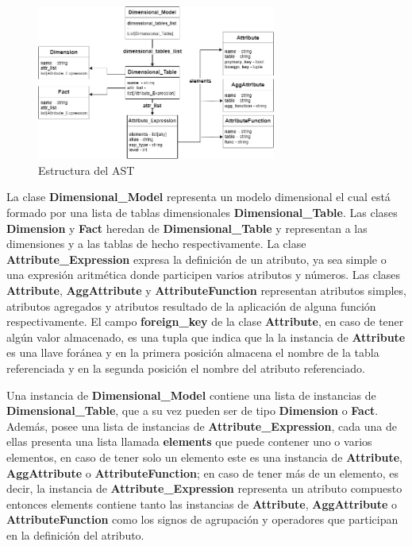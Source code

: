 \begin{figure}[htb]
    \centering
    \includegraphics[width=0.7\textwidth]{Graphics/ast.png}
    \caption{Estructura del AST}
    \label{fig:ast}
\end{figure}

La clase \textbf{Dimensional\_Model} representa un modelo dimensional el cual est\'a formado por una lista de tablas 
dimensionales \textbf{Dimensional\_Table}. Las clases \textbf{Dimension} y \textbf{Fact} heredan de \textbf{Dimensional\_Table} 
y representan a las dimensiones y a las tablas de hecho respectivamente. La clase \textbf{Attribute\_Expression} expresa 
la definición de un atributo, ya sea simple o una expresión aritmética donde participen varios atributos y n\'umeros. 
Las clases \textbf{Attribute}, \textbf{AggAttribute} y \textbf{AttributeFunction} representan atributos simples, atributos 
agregados y atributos resultado de la aplicación de alguna función respectivamente. El campo \textbf{foreign\_key} de 
la clase \textbf{Attribute}, en caso de tener alg\'un valor almacenado, es una tupla que indica que la la instancia 
de \textbf{Attribute} es una llave for\'anea y en la primera posición almacena el nombre de la tabla referenciada y 
en la segunda posición el nombre del atributo referenciado.

Una instancia de \textbf{Dimensional\_Model} contiene una lista de instancias de \textbf{Dimensional\_Table}, que a su vez pueden ser de tipo 
\textbf{Dimension} o \textbf{Fact}. Además, posee una lista de instancias de \textbf{Attribute\_Expression}, cada 
una de ellas presenta 
una lista llamada \textbf{elements} que puede contener uno o varios elementos, en caso de tener solo un elemento 
este es una instancia de \textbf{Attribute}, \textbf{AggAttribute} o \textbf{AttributeFunction}; en caso de tener 
m\'as de un elemento, es decir, la instancia de \textbf{Attribute\_Expression} representa un atributo compuesto entonces 
elements contiene tanto las instancias de \textbf{Attribute}, \textbf{AggAttribute} o \textbf{AttributeFunction} como 
los signos de agrupación y operadores que participan en la definición del atributo.

